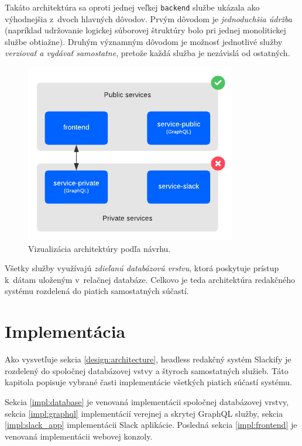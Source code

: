 \noindent Takáto architektúra sa oproti jednej veľkej \texttt{backend} službe ukázala ako výhodnejšia z~dvoch hlavných dôvodov. Prvým dôvodom je \emph{jednoduchšia údržba} (napríklad udržovanie logickej súborovej štruktúry bolo pri jednej monolitickej službe obtiažne). Druhým významným dôvodom je možnosť jednotlivé služby \emph{verziovať a vydávať samostatne}, pretože každá služba je nezávislá od ostatných.

\begin{figure}[h]
	\centering
	\includegraphics[scale=1.2]{obrazky-figures/architecture}
	\caption{Vizualizácia architektúry podľa návrhu.}
\end{figure}

\noindent Všetky služby využívajú \emph{zdieľanú databázovú vrstvu}, ktorá poskytuje prístup k~dátam uloženým v~relačnej databáze. Celkovo je teda architektúra redakčného systému rozdelená do piatich samostatných súčastí.

\chapter{Implementácia}
\label{impl}
Ako vysvetľuje sekcia \ref{design:architecture}, headless redakčný systém Slackify je rozdelený do spoločnej databázovej vstvy a štyroch samostatných služieb. Táto kapitola popisuje vybrané časti implementácie všetkých piatich súčastí systému.

Sekcia \ref{impl:database} je venovaná implementácii spoločnej databázovej vrstvy, sekcia \ref{impl:graphql} implementácií verejnej a skrytej GraphQL služby, sekcia \ref{impl:slack_app} implementácii Slack aplikácie. Posledná sekcia \ref{impl:frontend} je venovaná implementácii webovej konzoly.

